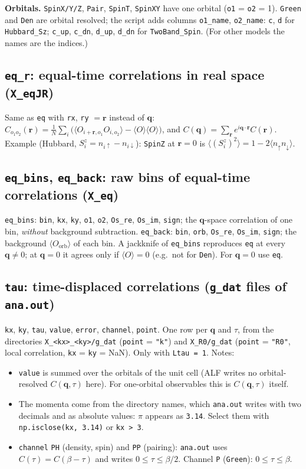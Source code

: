 \documentclass[11pt,a4paper]{article}
\newcommand{\f}[1]{\texttt{#1}}
\begin{document}
\textbf{Orbitals.} \f{SpinX/Y/Z}, \f{Pair}, \f{SpinT}, \f{SpinXY} have one orbital
(\f{o1} = \f{o2} = 1). \f{Green} and \f{Den} are orbital resolved; the script adds columns
\f{o1\_name}, \f{o2\_name}: \f{c}, \f{d} for \f{Hubbard\_Sz}; \f{c\_up}, \f{c\_dn}, \f{d\_up},
\f{d\_dn} for \f{TwoBand\_Spin}. (For other models the names are the indices.)

\subsection{\texttt{eq\_r}: equal-time correlations in real space (\texttt{X\_eqJR})}
Same as \f{eq} with \f{rx}, \f{ry} $=\mathbf r$ instead of $\mathbf q$:
$C_{o_1o_2}(\mathbf r)=\frac1N\sum_i\bigl(\langle O_{i+\mathbf r,o_1}O_{i,o_2}\rangle-\langle O\rangle\langle O\rangle\bigr)$,
and $C(\mathbf q)=\sum_{\mathbf r}e^{i\mathbf q\cdot\mathbf r}C(\mathbf r)$.
Example (Hubbard, $S^z_i=n_{i\uparrow}-n_{i\downarrow}$): \f{SpinZ} at $\mathbf r=0$ is
$\langle(S^z_i)^2\rangle=1-2\langle n_\uparrow n_\downarrow\rangle$.

\subsection{\texttt{eq\_bins}, \texttt{eq\_back}: raw bins of equal-time correlations (\texttt{X\_eq})}
\f{eq\_bins}: \f{bin}, \f{kx}, \f{ky}, \f{o1}, \f{o2}, \f{Os\_re}, \f{Os\_im}, \f{sign}; the
$\mathbf q$-space correlation of one bin, \emph{without} background subtraction.
\f{eq\_back}: \f{bin}, \f{orb}, \f{Os\_re}, \f{Os\_im}, \f{sign}; the background
$\langle O_\text{orb}\rangle$ of each bin. A jackknife of \f{eq\_bins} reproduces \f{eq} at
every $\mathbf q\neq0$; at $\mathbf q=0$ it agrees only if $\langle O\rangle=0$ (e.g.\ not for
\f{Den}). For $\mathbf q=0$ use \f{eq}.

\subsection{\texttt{tau}: time-displaced correlations (\texttt{g\_dat} files of \texttt{ana.out})}
\f{kx}, \f{ky}, \f{tau}, \f{value}, \f{error}, \f{channel}, \f{point}. One row per $\mathbf q$
and $\tau$, from the directories \f{X\_<kx>\_<ky>/g\_dat} (\f{point} = \f{"k"}) and
\f{X\_R0/g\_dat} (\f{point} = \f{"R0"}, local correlation, \f{kx} = \f{ky} = NaN).
Only with \f{Ltau = 1}. Notes:
\begin{itemize}
  \item \f{value} is summed over the orbitals of the unit cell (ALF writes no orbital-resolved
        $C(\mathbf q,\tau)$ here). For one-orbital observables this is $C(\mathbf q,\tau)$ itself.
  \item The momenta come from the directory names, which \f{ana.out} writes with two decimals
        and as absolute values: $\pi$ appears as \f{3.14}. Select them with
        \f{np.isclose(kx, 3.14)} or \f{kx > 3}.
  \item \f{channel} \f{PH} (density, spin) and \f{PP} (pairing): \f{ana.out} uses
        $C(\tau)=C(\beta-\tau)$ and writes $0\le\tau\le\beta/2$. Channel \f{P} (\f{Green}):
        $0\le\tau\le\beta$.
\end{itemize}
\end{document}
